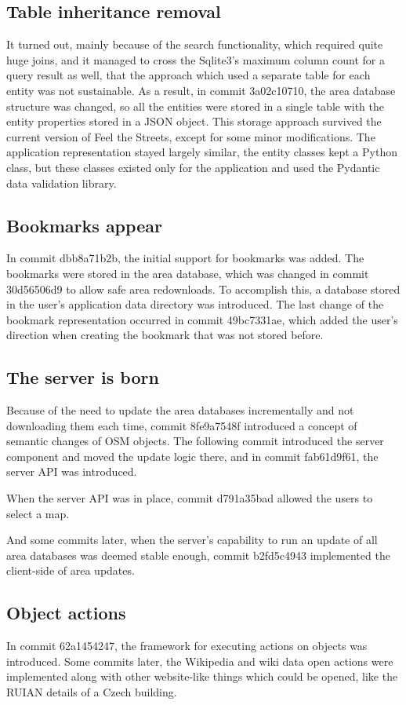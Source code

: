 \documentclass[nolof,digital]{fithesis3}
\begin{document}
\subsection{Table inheritance removal}
It turned out, mainly because of the search functionality, which required quite huge joins, and it managed to cross the Sqlite3's maximum column count for a query result as well, that the approach which used a separate table for each entity was not sustainable. As a result, in commit 3a02c10710, the area database structure was changed, so all the entities were stored in a single table with the entity properties stored in a JSON object. This storage approach survived the current version of Feel the Streets, except for some minor modifications. The application representation stayed largely similar, the entity classes kept a Python class, but these classes existed only for the application and used the Pydantic data validation library.
\subsection{Bookmarks appear}
In commit dbb8a71b2b, the initial support for bookmarks was added. The bookmarks were stored in the area database, which was changed in commit 30d56506d9 to allow safe area redownloads. To accomplish this, a database stored in the user's application data directory was introduced. The last change of the bookmark representation occurred in commit 49bc7331ae, which added the user's direction when creating the bookmark that was not stored before.
\subsection{The server is born}
Because of the need to update the area databases incrementally and not downloading them each time, commit 8fe9a7548f introduced a concept of semantic changes of OSM objects. The following commit introduced the server component and moved the update logic there, and in commit fab61d9f61, the server API was introduced.

When the server API was in place, commit d791a35bad allowed the users to select a map. 

And some commits later, when the server's capability to run an update of all area databases was deemed stable enough, commit b2fd5c4943 implemented the client-side of area updates.
\subsection{Object actions}
In commit 62a1454247, the framework for executing actions on objects was introduced. Some commits later, the Wikipedia and wiki data open actions were implemented along with other website-like things which could be opened, like the RUIAN details of a Czech building.
\end{document}
